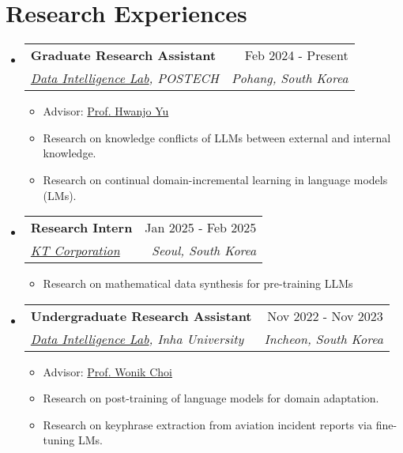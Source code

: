 \documentclass[letterpaper,11pt]{article}
\makeatletter
\newcommand{\resumeSubheading}[4]{
  \vspace{-1pt}\item
    \begin{tabular*}{0.97\textwidth}{l@{\extracolsep{\fill}}r}
      #1 & #2 \\
      \textit{\small#3} & \textit{\small #4} \\
    \end{tabular*}\vspace{-5pt}
}
\makeatother
\begin{document}
    \section{Research Experiences}
    \begin{itemize}[leftmargin=*,label=]

        \resumeSubheading
        {\textbf{Graduate Research Assistant} }{Feb 2024 - Present}
            {\href{https://sites.google.com/view/postechdi/home}{Data Intelligence Lab}, POSTECH}{Pohang, South Korea}
            \begin{itemize}[label=\bullet]
                \item Advisor: \href{https://sites.google.com/view/postechdi/member/faculty}{Prof. Hwanjo Yu}
                \item Research on knowledge conflicts of LLMs between external and internal knowledge.
                \item Research on continual domain-incremental learning in language models (LMs).
            \end{itemize}

        \resumeSubheading
        {\textbf{Research Intern}}{Jan 2025 - Feb 2025}
            {\href{https://corp.kt.com/eng/}{KT Corporation}}{Seoul, South Korea}
            \begin{itemize}[label=\bullet]
                \item Research on mathematical data synthesis for pre-training LLMs
            \end{itemize}
            
            
        \resumeSubheading
        {\textbf{Undergraduate Research Assistant} }{Nov 2022 - Nov 2023}
            {\href{http://dilab.inha.ac.kr/}{Data Intelligence Lab}, Inha University}{Incheon, South Korea}
            \begin{itemize}[label=\bullet]
                \item{Advisor: \href{http://bit.ly/3zSrQ8F}{Prof. Wonik Choi}}
                \item{Research on post-training of language models for domain adaptation.}
                \item{Research on keyphrase extraction from aviation incident reports via fine-tuning LMs.}
            \end{itemize}
            

\end{itemize}
\end{document}
